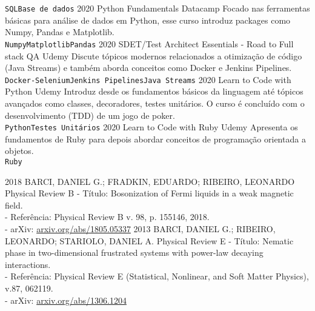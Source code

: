 \documentclass[9pt]{developercv} %
\begin{document}
\begin{entrylist}
{		\texttt{SQL}\slashsep\texttt{Base de dados}}
	\entry
		{2020}%
		{Python Fundamentals}
		{Datacamp}
		{Focado nas ferramentas básicas para análise de dados em Python, esse curso introduz packages como Numpy, Pandas e Matplotlib.\\ 
		\texttt{Numpy}\slashsep\texttt{Matplotlib}\slashsep\texttt{Pandas}}
	\entry
		{2020}
		{SDET/Test Architect Essentials - Road to Full stack QA}
		{Udemy}
		{Discute tópicos modernos relacionados a otimização de código (Java Streams) e também aborda conceitos como Docker e Jenkins Pipelines.\\ 
		\texttt{Docker-Selenium}\slashsep\texttt{Jenkins Pipelines}\slashsep\texttt{Java Streams}}
	\entry
		{2020}
		{Learn to Code with Python}
		{Udemy}
		{Introduz desde os fundamentos básicos da linguagem até tópicos avançados como classes, decoradores, testes unitários. O curso é concluído com o desenvolvimento (TDD) de um jogo de poker.\\ 
		\texttt{Python}\slashsep\texttt{Testes Unitários}}
	\entry
		{2020}
		{Learn to Code with Ruby}
		{Udemy}
		{Apresenta os fundamentos de Ruby para depois abordar conceitos de programação orientada a objetos.\\ 
		\texttt{Ruby}}
\end{entrylist}



\newpage
{}

\begin{entrylist}
	\entry
	{2018}
	{BARCI, DANIEL G.; FRADKIN, EDUARDO; RIBEIRO, LEONARDO}
	{Physical Review B}
	{- Título: Bosonization of Fermi liquids in a weak magnetic field.\\
	- Referência: Physical Review B v. 98, p. 155146, 2018.\\
	- arXiv: \href{https://arxiv.org/abs/1805.05337}{arxiv.org/abs/1805.05337} }
	\entry
	{2013}
	{BARCI, DANIEL G.; RIBEIRO, LEONARDO; STARIOLO, DANIEL A.}
	{Physical Review E}
	{- Título: Nematic phase in two-dimensional frustrated systems with power-law decaying interactions.\\
	- Referência: Physical Review E (Statistical, Nonlinear, and Soft Matter Physics), v.87, 062119.\\
	- arXiv: \href{http://arxiv.org/abs/1306.1204}{arxiv.org/abs/1306.1204} }
\end{entrylist}
\end{document}

